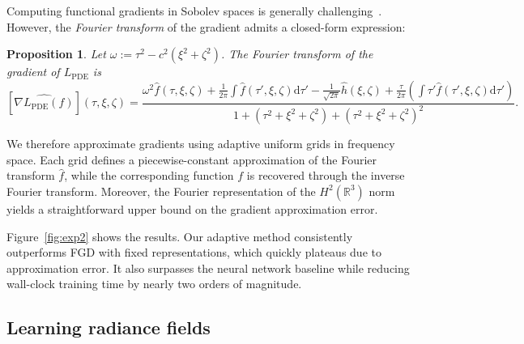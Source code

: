 \documentclass{article}
\newtheorem{proposition}[theorem]{Proposition}
\newcommand{\R}{\mathbb{R}}
\newcommand{\dif}{\mathrm{d}}
\begin{document}
Computing functional gradients in Sobolev spaces is generally challenging~\citep{fgd-random-gradientfree}.
However, the \emph{Fourier transform} of the gradient admits a closed-form expression:


\begin{proposition}\label{prop:gradient-pde}
    Let $\omega := \tau^2 - c^2(\xi^2+\zeta^2)$.
    The Fourier transform of the gradient of $L_\mathrm{PDE}$ is
    {\small
        \[\!\!\!
        [\widehat{\nabla L_\mathrm{PDE}(f)}](\tau,\xi,\zeta)
        \!=\!
        \frac{
            \omega^2 \widehat{f}(\tau,\xi,\zeta)
            + \frac{1}{2\pi}\int \widehat{f}(\tau',\xi,\zeta)\dif\tau'
            \!-\! \frac{1}{\sqrt{2\pi}}\widehat{h}(\xi,\zeta)
            + \frac{\tau}{2\pi}\left(\int \tau' \widehat{f}(\tau',\xi,\zeta)\dif\tau'\right)
        }{
            1 + (\tau^2+\xi^2+\zeta^2) + (\tau^2+\xi^2+\zeta^2)^2
        }.
    \]
    }
\end{proposition}

We therefore approximate gradients using adaptive uniform grids in frequency space.
Each grid defines a piecewise-constant approximation of the Fourier transform $\widehat{f}$, while the corresponding function $f$ is recovered through the inverse Fourier transform.
Moreover, the Fourier representation of the $H^2(\R^3)$ norm yields a straightforward upper bound on the gradient approximation error.

Figure~\ref{fig:exp2} shows the results.
Our adaptive method consistently outperforms FGD with fixed representations, which quickly plateaus due to approximation error.
It also surpasses the neural network baseline while reducing wall-clock training time by nearly two orders of magnitude.


\subsection{Learning radiance fields}
\end{document}
